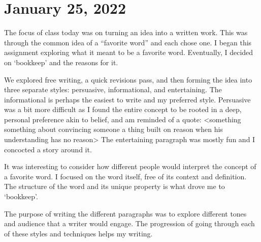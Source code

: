 \documentclass[journal.tex]{subfiles}
\begin{document}
\pagebreak
\section*{January 25, 2022}

The focus of class today was on turning an idea into a written work.
This was through the common idea of a ``favorite word'' and each chose one.
I began this assignment exploring what it meant to be a favorite word.
Eventually, I decided on `bookkeep' and the reasons for it.

We explored free writing, a quick revisions pass, and then forming the idea into three separate styles: persuasive, informational, and entertaining.
The informational is perhaps the easiest to write and my preferred style.
Persuasive was a bit more difficult as I found the entire concept to be rooted in a deep, personal preference akin to belief, and am reminded of a quote:
<something something about convincing someone a thing built on reason when his understanding has no reason>
The entertaining paragraph was mostly fun and I concocted a story around it.

It was interesting to consider how different people would interpret the concept of a favorite word.
I focused on the word itself, free of its context and definition.
The structure of the word and its unique property is what drove me to `bookkeep'.

The purpose of writing the different paragraphs was to explore different tones and audience that a writer would engage.
The progression of going through each of these styles and techniques helps my writing.
\end{document}
